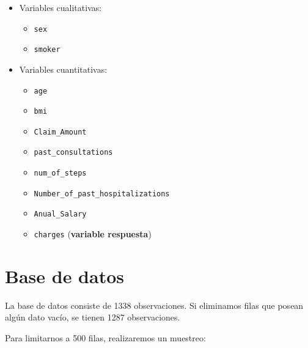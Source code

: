 \documentclass[
  letterpaper,
  DIV=11,
  numbers=noendperiod]{scrartcl}
\providecommand{\tightlist}{%
  \setlength{\itemsep}{0pt}\setlength{\parskip}{0pt}}\usepackage{longtable,booktabs,array}
\begin{document}
\begin{itemize}
\tightlist
\item
  Variables cualitativas:

  \begin{itemize}
  \tightlist
  \item
    \texttt{sex}
  \item
    \texttt{smoker}
  \end{itemize}
\item
  Variables cuantitativas:

  \begin{itemize}
  \tightlist
  \item
    \texttt{age}
  \item
    \texttt{bmi}
  \item
    \texttt{Claim\_Amount}
  \item
    \texttt{past\_consultations}
  \item
    \texttt{num\_of\_steps}
  \item
    \texttt{Number\_of\_past\_hospitalizations}
  \item
    \texttt{Anual\_Salary}
  \item
    \texttt{charges} (\textbf{variable respuesta})
  \end{itemize}
\end{itemize}

\section{Base de datos}\label{base-de-datos}

La base de datos consiste de 1338 observaciones. Si eliminamos filas que
posean algún dato vacío, se tienen 1287 observaciones.

Para limitarnos a 500 filas, realizaremos un muestreo:
\end{document}
